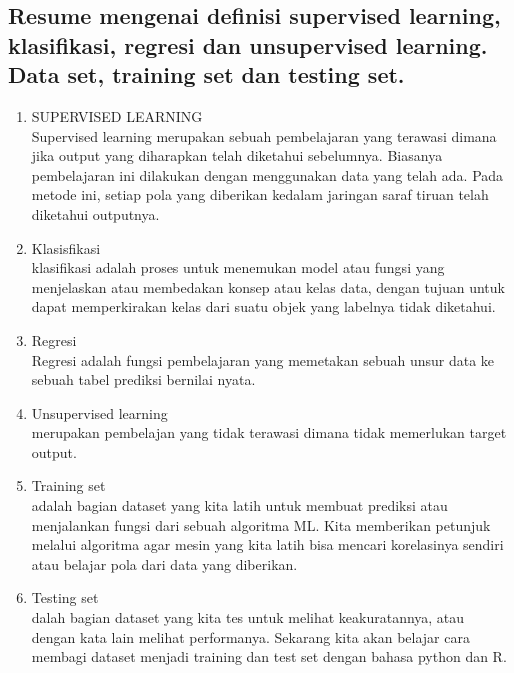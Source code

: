  \subsection{Resume mengenai definisi supervised learning, klasifikasi, regresi dan unsupervised learning. Data set, training set dan testing set.}
 \begin{enumerate}
     \item SUPERVISED LEARNING \\
      Supervised learning merupakan sebuah pembelajaran yang terawasi dimana jika output yang diharapkan telah diketahui sebelumnya. Biasanya pembelajaran ini dilakukan dengan menggunakan data yang telah ada. Pada metode ini, setiap pola yang diberikan kedalam jaringan saraf tiruan telah diketahui outputnya.
      
      \item Klasisfikasi \\
      klasifikasi adalah proses untuk menemukan model atau fungsi yang menjelaskan atau membedakan konsep atau kelas data, dengan tujuan untuk dapat memperkirakan kelas dari suatu objek yang labelnya tidak diketahui.
      
      \item Regresi \\
      Regresi adalah fungsi pembelajaran yang memetakan sebuah unsur data ke sebuah tabel prediksi bernilai nyata.
      
      \item Unsupervised learning \\
      merupakan pembelajan yang tidak terawasi dimana tidak memerlukan target output. 
      
      \item Training set \\
      adalah bagian dataset yang kita latih untuk membuat prediksi atau menjalankan fungsi dari sebuah algoritma ML. Kita memberikan petunjuk melalui algoritma agar mesin yang kita latih bisa mencari korelasinya sendiri atau belajar pola dari data yang diberikan.
      
      \item Testing set \\
      dalah bagian dataset yang kita tes untuk melihat keakuratannya, atau dengan kata lain melihat performanya.
      Sekarang kita akan belajar cara membagi dataset menjadi training dan test set dengan bahasa python dan R.
 \end{enumerate}
